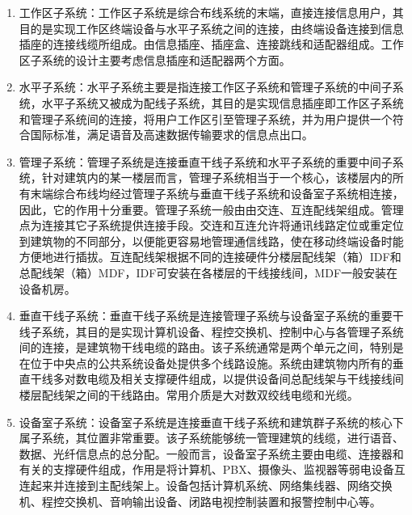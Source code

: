 \documentclass{gdutart}
\begin{document}
    \begin{enumerate}[label={(\arabic*)}]
      \item 工作区子系统：工作区子系统是综合布线系统的末端，直接连接信息用户，其目的是实现工作区终端设备与水平子系统之间的连接，由终端设备连接到信息插座的连接线缆所组成。由信息插座、插座盒、连接跳线和适配器组成。工作区子系统的设计主要考虑信息插座和适配器两个方面。
      \item 水平子系统：水平子系统主要是指连接工作区子系统和管理子系统的中间子系统，水平子系统又被成为配线子系统，其目的是实现信息插座即工作区子系统和管理子系统间的连接，将用户工作区引至管理子系统，并为用户提供一个符合国际标准，满足语音及高速数据传输要求的信息点出口。
      \item 管理子系统：管理子系统是连接垂直干线子系统和水平子系统的重要中间子系统，针对建筑内的某一楼层而言，管理子系统相当于一个核心，该楼层内的所有末端综合布线均经过管理子系统与垂直干线子系统和设备室子系统相连接，因此，它的作用十分重要。管理子系统一般由由交连、互连配线架组成。管理点为连接其它子系统提供连接手段。交连和互连允许将通讯线路定位或重定位到建筑物的不同部分，以便能更容易地管理通信线路，使在移动终端设备时能方便地进行插拔。互连配线架根据不同的连接硬件分楼层配线架（箱）IDF和总配线架（箱）MDF，IDF可安装在各楼层的干线接线间，MDF一般安装在设备机房。
      \item 垂直干线子系统：垂直干线子系统是连接管理子系统与设备室子系统的重要干线子系统，其目的是实现计算机设备、程控交换机、控制中心与各管理子系统间的连接，是建筑物干线电缆的路由。该子系统通常是两个单元之间，特别是在位于中央点的公共系统设备处提供多个线路设施。系统由建筑物内所有的垂直干线多对数电缆及相关支撑硬件组成，以提供设备间总配线架与干线接线间楼层配线架之间的干线路由。常用介质是大对数双绞线电缆和光缆。
      \item 设备室子系统：设备室子系统是连接垂直干线子系统和建筑群子系统的核心下属子系统，其位置非常重要。该子系统能够统一管理建筑的线缆，进行语音、数据、光纤信息点的总分配。一般而言，设备室子系统主要由电缆、连接器和有关的支撑硬件组成，作用是将计算机、PBX、摄像头、监视器等弱电设备互连起来并连接到主配线架上。设备包括计算机系统、网络集线器、网络交换机、程控交换机、音响输出设备、闭路电视控制装置和报警控制中心等。
    \end{enumerate}
\end{document}
